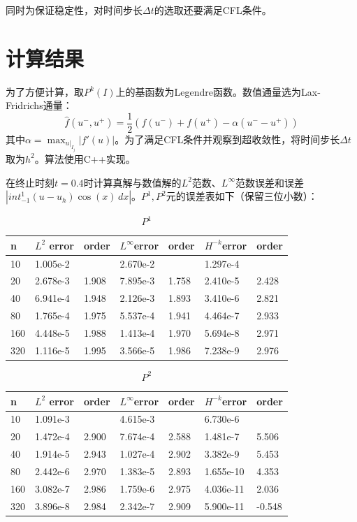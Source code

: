 \documentclass[12pt, a4paper]{ctexart}
\begin{document}
	同时为保证稳定性，对时间步长$\Delta t$的选取还要满足CFL条件。
	
	\section{计算结果}
	为了方便计算，取$P^k(I)$上的基函数为Legendre函数。数值通量选为Lax-Fridrichs通量：
	$$
	\hat{f}(u^-,u^+) = \frac{1}{2}(f(u^-) + f(u^+) - \alpha (u^- - u^+))
	$$
	其中$\alpha = \max_{u|_{I_j}} |f'(u) |$。为了满足CFL条件并观察到超收敛性，将时间步长$\Delta t$取为$h^2$。算法使用C++实现。
	
	在终止时刻$t=0.4$时计算真解与数值解的$L^2$范数、$L^\infty$范数误差和误差$|
	int_{-1}^1 (u-u_h)\cos(x) \, dx|$。$P^1,P^2$元的误差表如下（保留三位小数）：
	\begin{table}[htbp]
		\centering
		\caption{$P^1$}
		\begin{tabular}{| p{20pt}<{\centering} | p{50pt}<{\centering} | p{40pt}<{\centering} || p{50pt}<{\centering} | p{40pt}<{\centering}|| p{50pt}<{\centering} | p{40pt}<{\centering}|}
			\hline
			n & $L^2$ error & order & $L^\infty$error & order & $H^{-k}$error & order\\
			\hline
			10 & 1.005e-2 & & 2.670e-2 &  & 1.297e-4 & \\
			\hline
			20 & 2.678e-3 & 1.908 & 7.895e-3 & 1.758 & 2.410e-5 & 2.428 \\
			\hline
			40 & 6.941e-4 & 1.948 & 2.126e-3 & 1.893 & 3.410e-6 & 2.821\\
			\hline
			80 & 1.765e-4 & 1.975 & 5.537e-4 & 1.941 & 4.464e-7 & 2.933\\
			\hline
			160 & 4.448e-5 & 1.988 & 1.413e-4 & 1.970 & 5.694e-8 & 2.971\\
			\hline
			320 & 1.116e-5 & 1.995 & 3.566e-5 & 1.986 & 7.238e-9 & 2.976\\
			\hline
		\end{tabular}
	\end{table}

	\begin{table}[htbp]
	\centering
	\caption{$P^2$}
	\begin{tabular}{| p{20pt}<{\centering} | p{50pt}<{\centering} | p{40pt}<{\centering} || p{50pt}<{\centering} | p{40pt}<{\centering}|| p{50pt}<{\centering} | p{40pt}<{\centering}|}
		\hline
		n & $L^2$ error & order & $L^\infty$error & order & $H^{-k}$error & order\\
		\hline
		10 & 1.091e-3 & & 4.615e-3 &  & 6.730e-6 & \\
		\hline
		20 & 1.472e-4 & 2.900 & 7.674e-4 & 2.588 & 1.481e-7 & 5.506 \\
		\hline
		40 & 1.914e-5 & 2.943 & 1.027e-4 & 2.902 & 3.382e-9 & 5.453 \\
		\hline
		80 & 2.442e-6 & 2.970 & 1.383e-5 & 2.893 & 1.655e-10 & 4.353\\
		\hline
		160 & 3.082e-7 & 2.986 & 1.759e-6 & 2.975 & 4.036e-11 & 2.036\\
		\hline
		320 & 3.896e-8 & 2.984 & 2.342e-7 & 2.909 & 5.900e-11 & -0.548\\
		\hline
	\end{tabular}
	\end{table}
	
\end{document}
